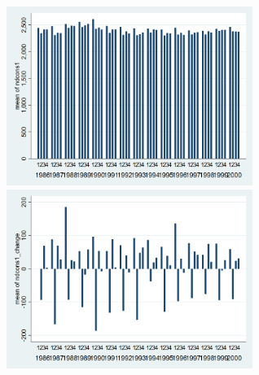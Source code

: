\documentclass[12pt,a4paper]{article}
\begin{document}
\begin{center}
\includegraphics[width=8cm]{graphs/ndcons1_quarterly.png}
\includegraphics[width=8cm]{graphs/ndcons1_change_quarterly.png}\\
\end{center}
\end{document}
